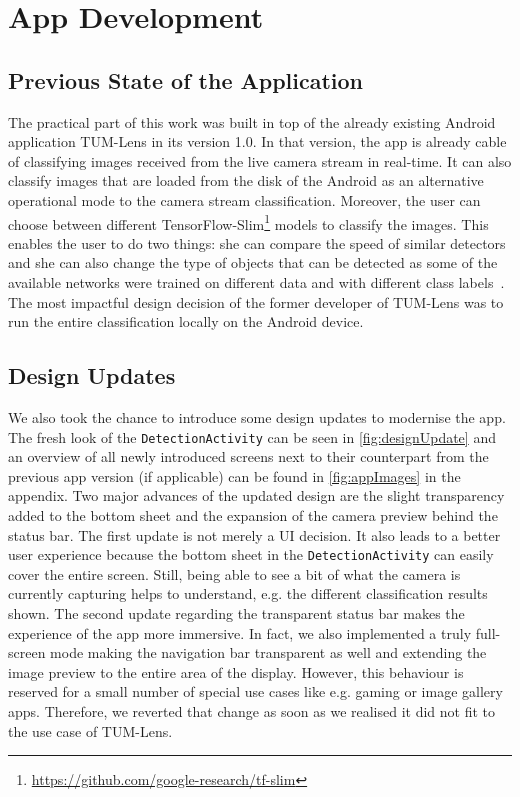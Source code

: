 \documentclass[
			   fontsize=11pt,
               paper=a4,
               bibliography=totoc,
               idxtotoc,
               headsepline,
               footsepline,
               footinclude=false,
               BCOR=12mm,
               DIV=13,
               openany,   %
               oneside    %
               ]
               {scrbook}
\newcommand{\code}[1]{\lstinline[basicstyle = \ttfamily\small]{#1}} %
\begin{document}

\part{App Development}

\chapter{Previous State of the Application} \label{sec:previousState}

The practical part of this work was built in top of the already existing Android application TUM-Lens in its version 1.0. In that version, the app is already cable of classifying images received from the live camera stream in real-time. It can also classify images that are loaded from the disk of the Android as an alternative operational mode to the camera stream classification. Moreover, the user can choose between different TensorFlow-Slim\footnote{\url{https://github.com/google-research/tf-slim}} models to classify the images. This enables the user to do two things: she can compare the speed of similar detectors and she can also change the type of objects that can be detected as some of the available networks were trained on different data and with different class labels~\cite{maxJokel}. The most impactful design decision of the former developer of TUM-Lens was to run the entire classification locally on the Android device.

\chapter{Design Updates}

We also took the chance to introduce some design updates to modernise the app. The fresh look of the \code{DetectionActivity} can be seen in \autoref{fig:designUpdate} and an overview of all newly introduced screens next to their counterpart from the previous app version (if applicable) can be found in \autoref{fig:appImages} in the appendix. Two major advances of the updated design are the slight transparency added to the bottom sheet and the expansion of the camera preview behind the status bar. The first update is not merely a UI decision. It also leads to a better user experience because the bottom sheet in the \code{DetectionActivity} can easily cover the entire screen. Still, being able to see a bit of what the camera is currently capturing helps to understand, e.g. the different classification results shown. The second update regarding the transparent status bar makes the experience of the app more immersive. In fact, we also implemented a truly full-screen mode making the navigation bar transparent as well and extending the image preview to the entire area of the display. However, this behaviour is reserved for a small number of special use cases like e.g. gaming or image gallery apps. Therefore, we reverted that change as soon as we realised it did not fit to the use case of TUM-Lens.
\end{document}
